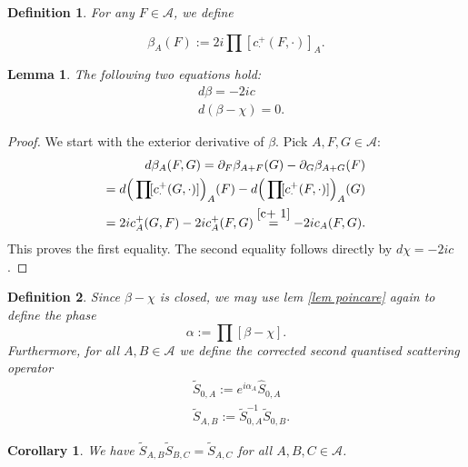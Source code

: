 \documentclass[a4paper,11pt]{article}
\newtheorem{de}{Definition}
\newtheorem{cor}{Corollary}
\newtheorem{lem}{Lemma}
\begin{document}
\begin{de}
For any \(F\in\mathcal{A}\), we define

\begin{equation}
\beta_A(F):=2i \prod\![c^+_{\cdot}(F,\cdot)]_A.
\end{equation}
\end{de}

\begin{lem}
The following two equations hold:
\begin{align}\label{beta c}
&d \beta=-2i c\\
&d(\beta -\chi)=0.
\end{align}
\end{lem}
\begin{proof}
We start with the exterior derivative of \(\beta\). Pick \(A,F,G\in\mathcal{A}\):
\begin{align}
d\beta_A(F,G)=\partial_F \beta_{A+F}(G)-\partial_G \beta_{A+G}(F)\\
=d\Big(\prod\![c^+_\cdot(G,\cdot)]\Big)_A(F)-d\Big(\prod\![c^+_\cdot(F,\cdot)]\Big)_A(G)\\
=2i c^+_A(G,F)-2i c_A^+(F,G)\overset{\eqref{c+ 1}}{=}-2i c_A(F,G).
\end{align}
This proves the first equality. The second equality follows directly by \(d \chi=-2i c\).
\end{proof}

\begin{de}
Since \(\beta-\chi\) is closed, we may use lem \ref{lem poincare} again to define the phase
\begin{equation}\label{def alpha}
\alpha:=\prod\![\beta-\chi].
\end{equation}
Furthermore, for all \(A,B\in\mathcal{A}\) we define the corrected second quantised scattering operator 
\begin{align}
&\tilde{S}_{0,A}:=e^{i\alpha_A} \hat{S}_{0,A}\\
&\tilde{S}_{A,B}:=\tilde{S}^{-1}_{0,A}\tilde{S}_{0,B}.
\end{align}
\end{de}

\begin{cor}
We have \(\tilde{S}_{A,B} \tilde{S}_{B,C}=\tilde{S}_{A,C}\) for all \(A,B,C\in\mathcal{A}\).
\end{cor}
\end{document}
